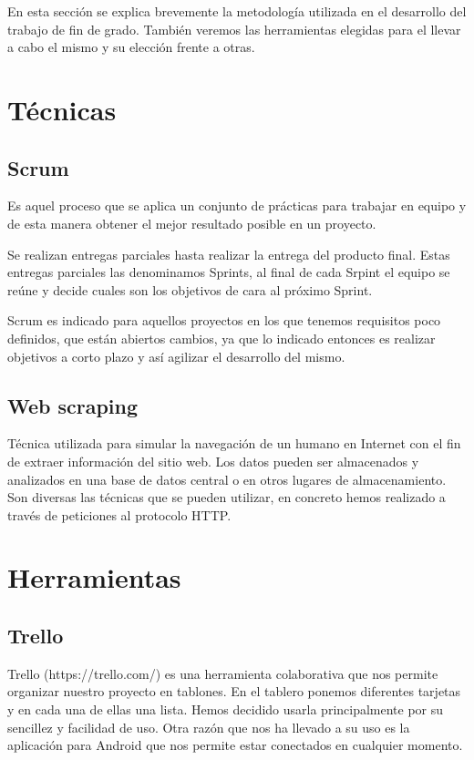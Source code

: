 

En esta sección se explica brevemente la metodología utilizada en el desarrollo del trabajo de fin de grado. También veremos las herramientas elegidas para el llevar a cabo el mismo y su elección frente a otras.

\section{Técnicas}

\subsection{Scrum} 
Es aquel proceso que se aplica un conjunto de prácticas para trabajar en equipo y de esta manera obtener el mejor resultado posible en un proyecto.

Se realizan entregas parciales hasta realizar la entrega del producto final. Estas entregas parciales las denominamos Sprints, al final de cada Srpint el equipo se reúne y decide cuales son los objetivos de cara al próximo Sprint.

Scrum es indicado para aquellos proyectos en los que  tenemos requisitos poco definidos, que están abiertos cambios, ya que lo indicado entonces es realizar objetivos a corto plazo y así  agilizar el desarrollo del mismo.

\subsection{Web scraping}

Técnica utilizada para simular  la navegación de un humano en Internet con el fin de extraer información del sitio web. Los datos pueden ser almacenados y analizados en una base de datos central o en otros lugares de almacenamiento.  Son diversas las técnicas que se pueden utilizar, en concreto hemos realizado a través de peticiones al protocolo HTTP.

\section{Herramientas}

\subsection{Trello}

Trello (https://trello.com/) es una herramienta colaborativa que nos permite organizar nuestro  proyecto en tablones. En el tablero ponemos diferentes tarjetas y en cada una de ellas una lista.
Hemos decidido usarla principalmente por su sencillez y facilidad de uso. Otra razón que nos ha llevado a su uso es la aplicación para Android que nos permite estar  conectados en cualquier momento.

